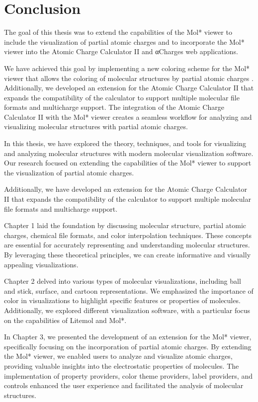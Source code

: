 \documentclass[
  digital,     %
  oneside,     %
  nosansbold,  %
  nocolorbold, %
  lof,         %
  lot,         %
]{fithesis4}
\begin{document}
\newpage
\chapter*{Conclusion}

The goal of this thesis was to extend the capabilities of the Mol* viewer to include the visualization of partial atomic charges and to incorporate the Mol* viewer into the Atomic Charge Calculator II and αCharges web applications.

We have achieved this goal by implementing a new coloring scheme for the Mol* viewer that allows the coloring of molecular structures by partial atomic charges
. Additionally, we developed an extension for the Atomic Charge Calculator II that expands the compatibility of the calculator to support multiple molecular file formats and multicharge support. The integration of the Atomic Charge Calculator II with the Mol* viewer creates a seamless workflow for analyzing and visualizing molecular structures with partial atomic charges.

In this thesis, we have explored the theory, techniques, and tools for visualizing and analyzing molecular structures with modern molecular visualization software. Our research focused on extending the capabilities of the Mol* viewer to support the visualization of partial atomic charges. 

Additionally, we have developed an extension for the Atomic Charge Calculator II that expands the compatibility of the calculator to support multiple molecular file formats and multicharge support. 

Chapter 1 laid the foundation by discussing molecular structure, partial atomic charges, chemical file formats, and color interpolation techniques. These concepts are essential for accurately representing and understanding molecular structures. By leveraging these theoretical principles, we can create informative and visually appealing visualizations.

Chapter 2 delved into various types of molecular visualizations, including ball and stick, surface, and cartoon representations. We emphasized the importance of color in visualizations to highlight specific features or properties of molecules. Additionally, we explored different visualization software, with a particular focus on the capabilities of Litemol and Mol*.

In Chapter 3, we presented the development of an extension for the Mol* viewer, specifically focusing on the incorporation of partial atomic charges. By extending the Mol* viewer, we enabled users to analyze and visualize atomic charges, providing valuable insights into the electrostatic properties of molecules. The implementation of property providers, color theme providers, label providers, and controls enhanced the user experience and facilitated the analysis of molecular structures.
\end{document}
